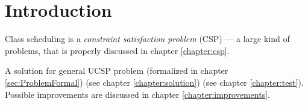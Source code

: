 \documentclass[ThesisDoc]{subfiles}
\begin{document}
\chapter{Introduction}

\todo

\medskip

Class scheduling is a \emph{constraint satisfaction problem} (CSP) ---
a large kind of problems, that is properly discussed in chapter \ref{chapter:csp}.

\medskip

\noindent
A solution for general UCSP problem
(formalized in chapter \ref{sec:ProblemFormal}) 
(see chapter \ref{chapter:solution})  (see chapter \ref{chapter:test}).
Possible improvements are discussed in chapter \ref{chapter:improvements}.
\end{document}
